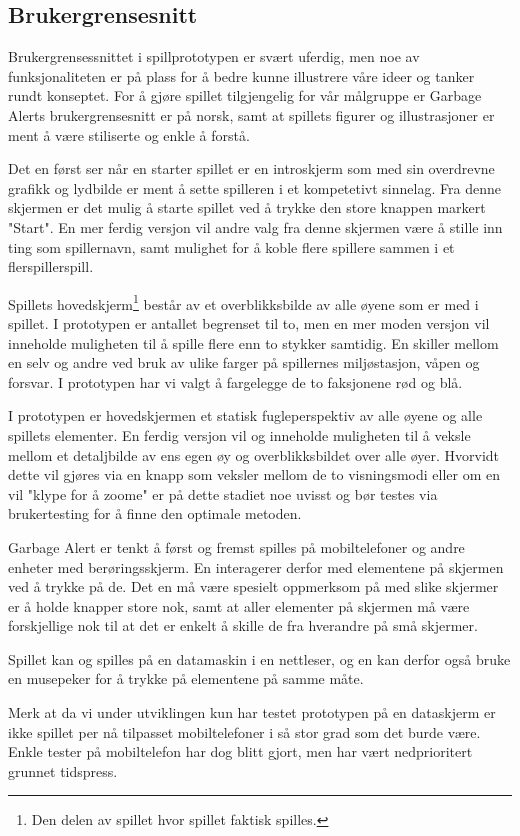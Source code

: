 


\subsection{Brukergrensesnitt}

Brukergrensessnittet i spillprototypen er svært uferdig, men noe av funksjonaliteten er på plass for å bedre kunne illustrere våre ideer og tanker rundt konseptet. 
For å gjøre spillet tilgjengelig for vår målgruppe er Garbage Alerts brukergrensesnitt er på norsk, samt at spillets figurer og illustrasjoner er ment å være stiliserte og enkle å forstå.


Det en først ser når en starter spillet er en introskjerm som med sin overdrevne grafikk og lydbilde er ment å sette spilleren i et kompetetivt sinnelag.
Fra denne skjermen er det mulig å starte spillet ved å trykke den store knappen markert "Start".
En mer ferdig versjon vil andre valg fra denne skjermen være å stille inn ting som spillernavn, samt mulighet for å koble flere spillere sammen i et flerspillerspill.


Spillets hovedskjerm\footnote{Den delen av spillet hvor spillet faktisk spilles.} består av et overblikksbilde av alle øyene som er med i spillet. I prototypen er antallet begrenset til to, men en mer moden versjon vil inneholde muligheten til å spille flere enn to stykker samtidig. En skiller mellom en selv og andre ved bruk av ulike farger på spillernes miljøstasjon, våpen og forsvar. I prototypen har vi valgt å fargelegge de to faksjonene rød og blå.

I prototypen er hovedskjermen et statisk fugleperspektiv av alle øyene og alle spillets elementer. En ferdig versjon vil og inneholde muligheten til å veksle mellom et detaljbilde av ens egen øy og overblikksbildet over alle øyer. Hvorvidt dette vil gjøres via en knapp som veksler mellom de to visningsmodi eller om en vil "klype for å zoome" er på dette stadiet noe uvisst og bør testes via brukertesting for å finne den optimale metoden.

Garbage Alert er tenkt å først og fremst spilles på mobiltelefoner og andre enheter med berøringsskjerm. En interagerer derfor med elementene på skjermen ved å trykke på de. Det en må være spesielt oppmerksom på med slike skjermer er å holde knapper store nok, samt at aller elementer på skjermen må være forskjellige nok til at det er enkelt å skille de fra hverandre på små skjermer.

Spillet kan og spilles på en datamaskin i en nettleser, og en kan derfor også bruke en musepeker for å trykke på elementene på samme måte.

Merk at da vi under utviklingen kun har testet prototypen på en dataskjerm er ikke spillet per nå tilpasset mobiltelefoner i så stor grad som det burde være. Enkle tester på mobiltelefon har dog blitt gjort, men har vært nedprioritert grunnet tidspress.
